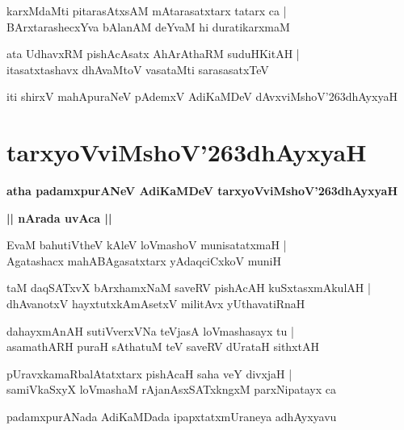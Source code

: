 \documentclass[twoside,12pt,openright]{book}
\def\S{\char'263}
\newcounter{shloka}[chapter]
\def\uvaca#1{\centerline{{\large\textbf{#1}}}}
\begin{document}
\begin{shloka}
karxMdaMti pitarasAtxsAM mAtarasatxtarx tatarx ca |\\
BArxtarashecxYva bAlanAM deYvaM hi duratikarxmaM 
\end{shloka}

\begin{shloka}
ata UdhavxRM pishAcAsatx AhArAthaRM suduHKitAH |\\
itasatxtashavx dhAvaMtoV vasataMti sarasasatxTeV 
\end{shloka}

\begin{center}
iti shirxV mahApuraNeV pAdemxV AdiKaMDeV dAvxviMshoV\S dhAyxyaH 
\end{center}

\chapter{tarxyoVviMshoV\S dhAyxyaH}

\begin{center}
{\LARGE\bfseries atha padamxpurANeV AdiKaMDeV tarxyoVviMshoV\S dhAyxyaH}
\end{center}

\uvaca{|| nArada uvAca ||}

\begin{shloka}
EvaM bahutiVtheV kAleV loVmashoV munisatatxmaH  |\\
Agatashacx mahABAgasatxtarx yAdaqciCxkoV muniH
\end{shloka}

\begin{shloka}
taM daqSATxvX bArxhamxNaM saveRV pishAcAH kuSxtasxmAkulAH |\\
dhAvanotxV hayxtutxkAmAsetxV militAvx yUthavatiRnaH 
\end{shloka}

\begin{shloka}
dahayxmAnAH sutiVverxVNa teVjasA loVmashasayx tu |\\
asamathARH puraH sAthatuM teV saveRV dUrataH sithxtAH 
\end{shloka}

\begin{shloka}
pUravxkamaRbalAtatxtarx pishAcaH saha veY divxjaH |\\
samiVkaSxyX  loVmashaM rAjanAsxSATxkngxM parxNipatayx ca
\end{shloka}

\begin{center}
padamxpurANada AdiKaMDada ipapxtatxmUraneya adhAyxyavu
\end{center}
\end{document}
